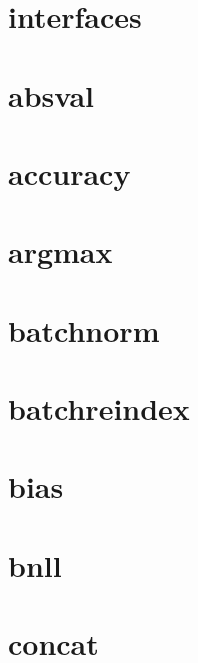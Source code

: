 \documentclass[twoside]{book}
\newcommand{\+}{\discretionary{\mbox{\scriptsize$\hookleftarrow$}}{}{}}
\begin{document}
\chapter{interfaces}
\label{md_docs_tutorial_interfaces}

\chapter{absval}
\label{md_docs_tutorial_layers_absval}

\chapter{accuracy}
\label{md_docs_tutorial_layers_accuracy}

\chapter{argmax}
\label{md_docs_tutorial_layers_argmax}

\chapter{batchnorm}
\label{md_docs_tutorial_layers_batchnorm}

\chapter{batchreindex}
\label{md_docs_tutorial_layers_batchreindex}

\chapter{bias}
\label{md_docs_tutorial_layers_bias}

\chapter{bnll}
\label{md_docs_tutorial_layers_bnll}

\chapter{concat}
\label{md_docs_tutorial_layers_concat}

\end{document}
